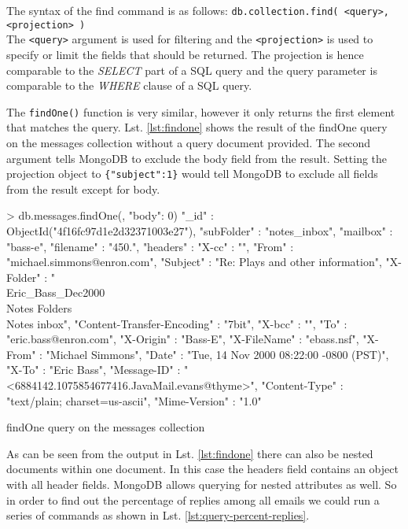 The syntax of the find command is as follows: \texttt{db.collection.find(
<query>, <projection> )}\\
The \texttt{<query>} argument is used for filtering and the \texttt{<projection>} is used to specify
or limit the fields that should be returned.
The projection is hence comparable to the \textit{SELECT} part of a SQL query and the
query parameter is comparable to the \textit{WHERE} clause of a SQL query.


The \texttt{findOne()} function is very similar, however it only returns the first
element that matches the query. Lst. \ref{lst:findone} shows the result of the
findOne query on the messages collection without a query document provided. The
second argument tells MongoDB to exclude the body field from the result. Setting
the projection object to \texttt{\{"subject":1\}} would tell MongoDB to exclude
all fields from the result except for body.

\begin{listing}
    \begin{javascriptcode}
> db.messages.findOne({}, {"body": 0})
{
    "_id" : ObjectId("4f16fc97d1e2d32371003e27"),
    "subFolder" : "notes_inbox",
    "mailbox" : "bass-e",
    "filename" : "450.",
    "headers" : {
        "X-cc" : "",
        "From" : "michael.simmons@enron.com",
        "Subject" : "Re: Plays and other information",
        "X-Folder" : "\\Eric_Bass_Dec2000\\Notes Folders\\Notes inbox",
        "Content-Transfer-Encoding" : "7bit",
        "X-bcc" : "",
        "To" : "eric.bass@enron.com",
        "X-Origin" : "Bass-E",
        "X-FileName" : "ebass.nsf",
        "X-From" : "Michael Simmons",
        "Date" : "Tue, 14 Nov 2000 08:22:00 -0800 (PST)",
        "X-To" : "Eric Bass",
        "Message-ID" : "<6884142.1075854677416.JavaMail.evans@thyme>",
        "Content-Type" : "text/plain; charset=us-ascii",
        "Mime-Version" : "1.0"
    }
}
    \end{javascriptcode}
    \caption{findOne query on the messages collection}
    \label{lst:findone}
\end{listing}

As can be seen from the output in Lst. \ref{lst:findone} there can also be nested documents
within one document. In this case the headers field contains an object with all header fields.
MongoDB allows querying for nested attributes as well. So in order to find out the percentage of
replies among all emails we could run a series of commands as shown in Lst. \ref{lst:query-percent-replies}.

